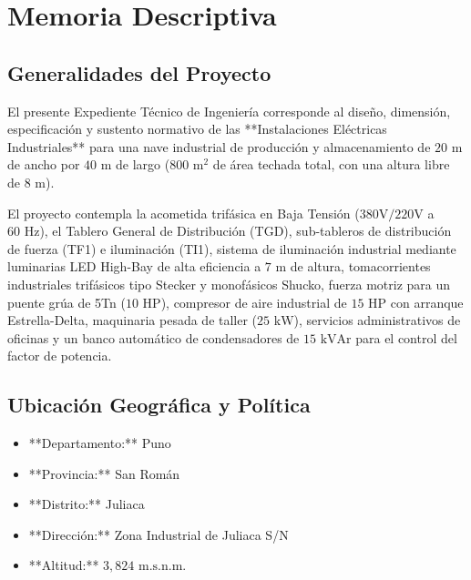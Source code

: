 \chapter{Memoria Descriptiva}

\section{Generalidades del Proyecto}
El presente Expediente Técnico de Ingeniería corresponde al diseño, dimensión, especificación y sustento normativo de las **Instalaciones Eléctricas Industriales** para una nave industrial de producción y almacenamiento de $20\text{ m}$ de ancho por $40\text{ m}$ de largo ($800\text{ m}^2$ de área techada total, con una altura libre de $8\text{ m}$).

El proyecto contempla la acometida trifásica en Baja Tensión ($380\text{V} / 220\text{V}$ a $60\text{ Hz}$), el Tablero General de Distribución (TGD), sub-tableros de distribución de fuerza (TF1) e iluminación (TI1), sistema de iluminación industrial mediante luminarias LED High-Bay de alta eficiencia a $7\text{ m}$ de altura, tomacorrientes industriales trifásicos tipo Stecker y monofásicos Shucko, fuerza motriz para un puente grúa de 5Tn ($10\text{ HP}$), compresor de aire industrial de $15\text{ HP}$ con arranque Estrella-Delta, maquinaria pesada de taller ($25\text{ kW}$), servicios administrativos de oficinas y un banco automático de condensadores de $15\text{ kVAr}$ para el control del factor de potencia.

\section{Ubicación Geográfica y Política}
\begin{itemize}
    \item **Departamento:** Puno
    \item **Provincia:** San Román
    \item **Distrito:** Juliaca
    \item **Dirección:** Zona Industrial de Juliaca S/N
    \item **Altitud:** $3,824\text{ m.s.n.m.}$
\end{itemize}

